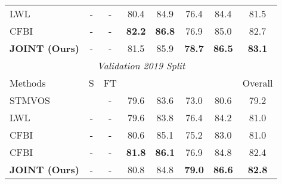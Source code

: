 \documentclass[10pt,twocolumn,letterpaper]{article}
\begin{document}
\begin{table}[htbp]
\begin{center}
{\begin{tabular*}{\hsize}{@{}@{\extracolsep{\fill}}lccccccc@{}}
			LWL  \cite{Goutam2020A}  & - & - &  80.4 & 84.9 & 76.4 & 84.4 & 81.5\\
			CFBI  \cite{CFBI2020A} & - & - & \textbf{82.2} & \textbf{86.8} & 76.9 & 85.0 & 82.7\\
\textbf{JOINT (Ours)} & - & - & 81.5 & 85.9 & \textbf{78.7} & \textbf{86.5}& \textbf{83.1}\\
			\midrule[1.0pt]
\multicolumn{8}{c}{\emph{Validation 2019 Split}} \\
			\midrule
			Methods & S & FT &  &  &  &  & Overall\\
			\midrule
			STMVOS  \cite{Seoung2019A} & \checkmark & - & 79.6 & 83.6 & 73.0 & 80.6 & 79.2\\
			\midrule
			LWL  \cite{Goutam2020A} & - & - & 79.6 & 83.8 & 76.4 & 84.2 & 81.0\\
			CFBI  \cite{CFBI2020A} & - & - & 80.6 & 85.1 & 75.2 & 83.0 & 81.0\\
			CFBI  \cite{CFBI2020A} & - & - & \textbf{81.8} & \textbf{86.1} & 76.9 & 84.8 & 82.4\\
\textbf{JOINT (Ours)} & - & - & 80.8 & 84.8 & \textbf{79.0} & \textbf{86.6} & \textbf{82.8}\\
			\bottomrule[1.0pt]
		\end{tabular*}
		}
	\end{center}
	\label{table:yt-val}
	\vspace{-2.5em}
\end{table}
\end{document}

